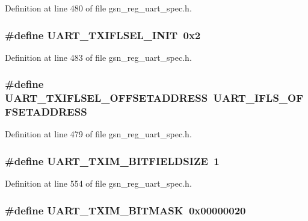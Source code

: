 Definition at line 480 of file gsn\_\-reg\_\-uart\_\-spec.h.

\hypertarget{a00575_a6bee2c6e9a0645d4b94bff23154cedc3}{
\subsubsection[{UART\_\-TXIFLSEL\_\-INIT}]{\setlength{\rightskip}{0pt plus 5cm}\#define UART\_\-TXIFLSEL\_\-INIT~0x2}}
\label{a00575_a6bee2c6e9a0645d4b94bff23154cedc3}


Definition at line 483 of file gsn\_\-reg\_\-uart\_\-spec.h.

\hypertarget{a00575_ad7efbc8feff6205fc912cb05116cd045}{
\subsubsection[{UART\_\-TXIFLSEL\_\-OFFSETADDRESS}]{\setlength{\rightskip}{0pt plus 5cm}\#define UART\_\-TXIFLSEL\_\-OFFSETADDRESS~UART\_\-IFLS\_\-OFFSETADDRESS}}
\label{a00575_ad7efbc8feff6205fc912cb05116cd045}


Definition at line 479 of file gsn\_\-reg\_\-uart\_\-spec.h.

\hypertarget{a00575_adcd7b6190dd0ad984e4ee8e185bd4dc2}{
\subsubsection[{UART\_\-TXIM\_\-BITFIELDSIZE}]{\setlength{\rightskip}{0pt plus 5cm}\#define UART\_\-TXIM\_\-BITFIELDSIZE~1}}
\label{a00575_adcd7b6190dd0ad984e4ee8e185bd4dc2}


Definition at line 554 of file gsn\_\-reg\_\-uart\_\-spec.h.

\hypertarget{a00575_a4b5adaed0f55f3503e76eb8ec0adc351}{
\subsubsection[{UART\_\-TXIM\_\-BITMASK}]{\setlength{\rightskip}{0pt plus 5cm}\#define UART\_\-TXIM\_\-BITMASK~0x00000020}}
\label{a00575_a4b5adaed0f55f3503e76eb8ec0adc351}


